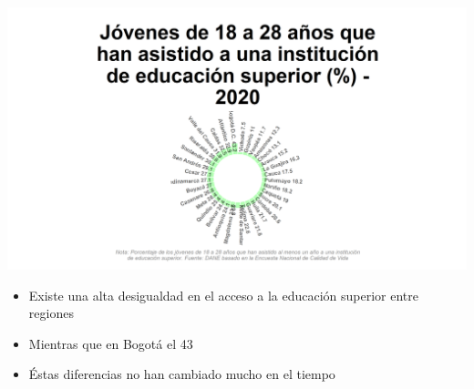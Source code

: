 \documentclass[aspectratio=169]{beamer}
\begin{document}
    \begin{slide}{14} 
                      \begin{imagecolumn}
                \includegraphics[width=\columnwidth]{img/var_127_static.png}
            \end{imagecolumn}
            \begin{textcolumn}
                \begin{itemize}
                    \item Existe una alta desigualdad en el acceso a la educación superior entre regiones
                    \item Mientras que en Bogotá el 43%
                    \item Éstas diferencias no han cambiado mucho en el tiempo 
                \end{itemize}
            \end{textcolumn}

    \printcolumns
    \end{slide}
    
\end{document}

